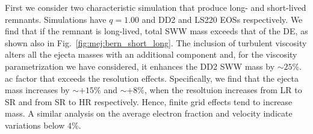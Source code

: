 %
First we consider two characteristic simulation that produce long- and short-lived
remnants. Simulations have $q=1.00$ and DD2 and LS220 \acp{EOS} respectively.
We find that if the remnant is long-lived, total \ac{SWW} mass exceeds that of the \ac{DE},
as shown also in Fig.~\ref{fig:mej:bern_short_long}.
%
%
The inclusion of turbulent viscosity alters all the ejecta masses with an
additional component \cite{Radice:2018ghv} and, for the viscosity parametrization we
have considered, it enhances the DD2 \ac{SWW} mass by ${\sim}25$\%. 
ac factor that exceeds the resolution effects.
%
Specifically, we find that the ejecta mass increases by ${\sim}+15\%$ and ${\sim}+8\%$, 
when the resoltuion increases from LR to SR and from SR to HR respectively.
Hence, finite grid effects tend to increase mass. A similar analysis on the average 
electron fraction and velocity indicate variations below $4\%$.

